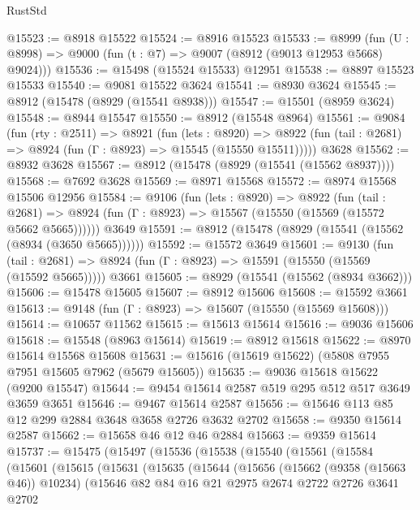 \begin{lexlean}{RustStd}
\begin{coremodule}
@15523 := @8918 @15522
@15524 := @8916 @15523
@15533 := @8999
    (fun (U : @8998) => @9000 (fun (t : @7) => @9007 (@8912 (@9013 @12953 @5668) @9024)))
@15536 := @15498 (@15524 @15533) @12951
@15538 := @8897 @15523 @15533
@15540 := @9081 @15522 @3624
@15541 := @8930 @3624
@15545 := @8912 (@15478 (@8929 (@15541 @8938)))
@15547 := @15501 (@8959 @3624)
@15548 := @8944 @15547
@15550 := @8912 (@15548 @8964)
@15561 := @9084
    (fun (rty : @2511) =>
    @8921
      (fun (lets : @8920) =>
      @8922 (fun (tail : @2681) => @8924 (fun (Γ : @8923) => @15545 (@15550 @15511)))))
    @3628
@15562 := @8932 @3628
@15567 := @8912 (@15478 (@8929 (@15541 (@15562 @8937))))
@15568 := @7692 @3628
@15569 := @8971 @15568
@15572 := @8974 @15568 @15506 @12956
@15584 := @9106
    (fun (lets : @8920) =>
    @8922
      (fun (tail : @2681) =>
      @8924 (fun (Γ : @8923) => @15567 (@15550 (@15569 (@15572 @5662 @5665))))))
    @3649
@15591 := @8912 (@15478 (@8929 (@15541 (@15562 (@8934 (@3650 @5665))))))
@15592 := @15572 @3649
@15601 := @9130
    (fun (tail : @2681) => @8924 (fun (Γ : @8923) => @15591 (@15550 (@15569 (@15592 @5665)))))
    @3661
@15605 := @8929 (@15541 (@15562 (@8934 @3662)))
@15606 := @15478 @15605
@15607 := @8912 @15606
@15608 := @15592 @3661
@15613 := @9148 (fun (Γ : @8923) => @15607 (@15550 (@15569 @15608)))
@15614 := @10657 @11562
@15615 := @15613 @15614
@15616 := @9036 @15606
@15618 := @15548 (@8963 @15614)
@15619 := @8912 @15618
@15622 := @8970 @15614 @15568 @15608
@15631 := @15616 (@15619 @15622) (@5808 @7955 @7951 @15605 @7962 (@5679 @15605))
@15635 := @9036 @15618 @15622 (@9200 @15547)
@15644 := @9454 @15614 @2587 @519 @295 @512 @517 @3649 @3659 @3651
@15646 := @9467 @15614 @2587
@15656 := @15646 @113 @85 @12 @299 @2884 @3648 @3658 @2726 @3632 @2702
@15658 := @9350 @15614 @2587
@15662 := @15658 @46 @12 @46 @2884
@15663 := @9359 @15614
@15737 := @15475
    (@15497
      (@15536
        (@15538
          (@15540
            (@15561
              (@15584
                (@15601
                  (@15615
                    (@15631
                      (@15635
                        (@15644
                          (@15656
                            (@15662 (@9358 (@15663 @46)) @10234)
                            (@15646
                              @82
                              @84
                              @16
                              @21
                              @2975
                              @2674
                              @2722
                              @2726
                              @3641
                              @2702

\end{coremodule}
\end{lexlean}
